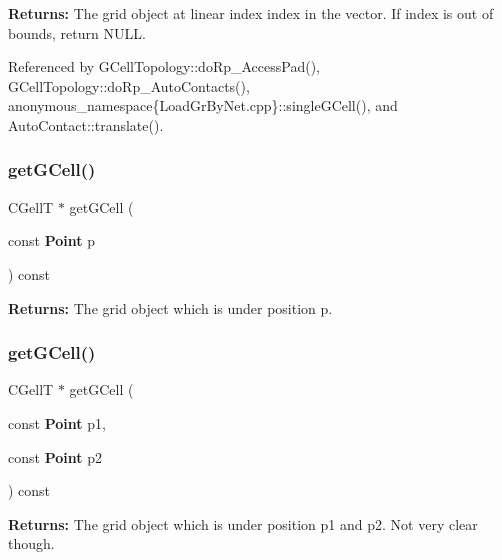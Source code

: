 {\bfseries Returns\+:} The grid object at linear index {\ttfamily index} in the vector. If {\ttfamily index} is out of bounds, return {\ttfamily N\+U\+LL}. 

Referenced by G\+Cell\+Topology\+::do\+Rp\+\_\+\+Access\+Pad(), G\+Cell\+Topology\+::do\+Rp\+\_\+\+Auto\+Contacts(), anonymous\+\_\+namespace\{\+Load\+Gr\+By\+Net.\+cpp\}\+::single\+G\+Cell(), and Auto\+Contact\+::translate().

\mbox{\label{classKatabatic_1_1Grid_a0ee3cd2fb8c66458b0d00e39826921da}} 
\subsubsection{\texorpdfstring{get\+G\+Cell()}{getGCell()}\hspace{0.1cm}{\footnotesize\ttfamily [2/3]}}
{\footnotesize\ttfamily C\+GellT $\ast$ get\+G\+Cell (\begin{DoxyParamCaption}\item[{const \textbf{ Point}}]{p }\end{DoxyParamCaption}) const\hspace{0.3cm}{\ttfamily [inline]}}

{\bfseries Returns\+:} The grid object which is under position {\ttfamily p}. \mbox{\label{classKatabatic_1_1Grid_a1beb5c490b2e651eab49178297b6cda2}} 
\subsubsection{\texorpdfstring{get\+G\+Cell()}{getGCell()}\hspace{0.1cm}{\footnotesize\ttfamily [3/3]}}
{\footnotesize\ttfamily C\+GellT $\ast$ get\+G\+Cell (\begin{DoxyParamCaption}\item[{const \textbf{ Point}}]{p1,  }\item[{const \textbf{ Point}}]{p2 }\end{DoxyParamCaption}) const\hspace{0.3cm}{\ttfamily [inline]}}

{\bfseries Returns\+:} The grid object which is under position {\ttfamily p1} and {\ttfamily p2}. Not very clear though. \mbox{\label{classKatabatic_1_1Grid_ae5041816e75468b69bb0bbf24a4e8eca}} 
